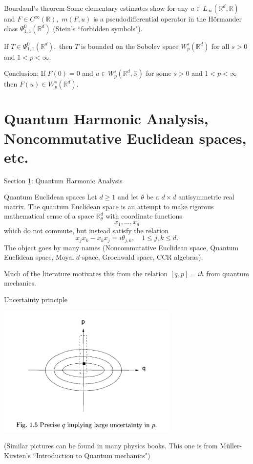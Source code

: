 \documentclass{beamer}
\numberwithin{equation}{section}
\theoremstyle{plain}
\theoremstyle{plain}
\theoremstyle{definition}
\theoremstyle{plain}
\theoremstyle{plain}
\theoremstyle{definition}
\newcommand{\Rl}{\mathbb{R}}
\begin{document}
\begin{frame}{Bourdaud's theorem}
    Some elementary estimates show for any $u\in L_{\infty}(\Rl^d,\Rl)$ and $F\in C^\infty(\Rl),$ $m(F,u)$ is a pseudodifferential operator in the H\"ormander class $\Psi^0_{1,1}(\Rl^d)$ (Stein's ``forbidden symbols").

    \begin{theorem}[Bourdaud (1988)]
        If $T \in \Psi^0_{1,1}(\Rl^d),$ then $T$ is bounded on the Sobolev space $W^s_p(\Rl^d)$ for all $s>0$ and $1<p<\infty.$
    \end{theorem}
\pause
    Conclusion: If $F(0)=0$ and $u\in W^s_p(\Rl^d,\Rl)$ for some $s>0$ and $1<p<\infty$ then $F(u)\in W^s_p(\Rl^d).$
\end{frame}

\section{Quantum Harmonic Analysis, Noncommutative Euclidean spaces, etc.}\label{qha_section}

\begin{frame}
    \Huge{Section \ref{qha_section}: Quantum Harmonic Analysis}
\end{frame}


\begin{frame}{Quantum Euclidean spaces}
    Let $d\geq 1$ and let $\theta$ be a $d\times d$ antisymmetric real matrix. The quantum Euclidean space is an attempt to make rigorous mathematical sense of a space $\Rl^d_\theta$ with coordinate functions
    \[
        x_1,\ldots,x_d
    \]
    which do not commute, but instead satisfy the relation
    \[
        x_jx_k-x_kx_j = i\theta_{j,k},\quad 1\leq j,k\leq d.
    \]
    The object goes by many names (Noncommutative Euclidean space, Quantum Euclidean space, Moyal $d$-space, Groenwald space, CCR algebras).\pause

    Much of the literature motivates this from the relation $[q,p]=i\hbar$ from quantum mechanics.
\end{frame}

\begin{frame}{Uncertainty principle}
\begin{center}
    \includegraphics[width=90mm]{muller-kirsten-uncertainty.png}
\end{center}
(Similar pictures can be found in many physics books. This one is from M\"uller-Kirsten's ``Introduction to Quantum mechanics")
\end{frame}
\end{document}
